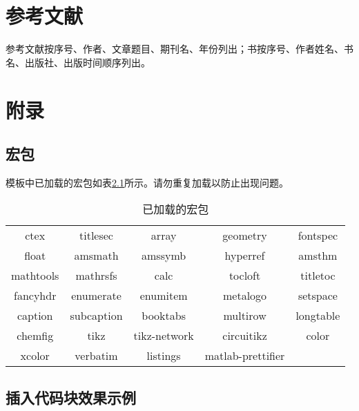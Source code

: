 \chapter{参考文献}

参考文献按序号、作者、文章题目、期刊名、年份列出；书按序号、作者姓名、书名、出版社、出版时间顺序列出。

\printbibliography[heading=none]

\newpage

\chapter{附录}

\section{宏包}

模板中已加载的宏包如表\ref{tab:packs}所示。请勿重复加载以防止出现问题。

\begin{table}[!h]
    \centering
    \caption{已加载的宏包}\label{tab:packs}
    \begin{tabular}{ccccc}
        \toprule
        ctex & titlesec & array & geometry & fontspec \\
        float & amsmath & amssymb & hyperref & amsthm \\
        mathtools & mathrsfs & calc & tocloft & titletoc \\
        fancyhdr & enumerate & enumitem & metalogo & setspace \\
        caption & subcaption & booktabs & multirow & longtable \\
        chemfig & tikz & tikz-network & circuitikz & color \\
        xcolor & verbatim & listings & matlab-prettifier &  \\
        \bottomrule
        \end{tabular}
\end{table}

\section{插入代码块效果示例}


